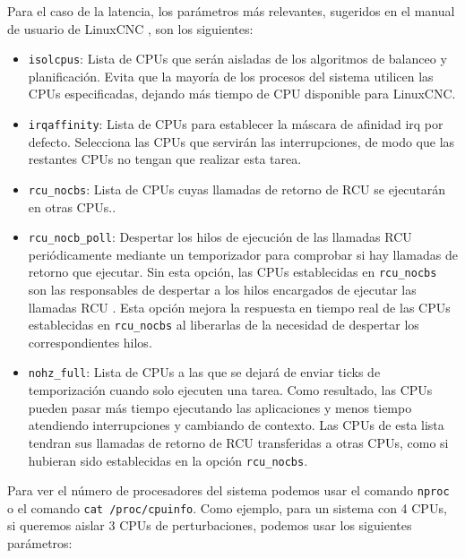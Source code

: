 \documentclass[english,spanish,a4paper,11pt]{article}
\begin{document}
Para el caso de la latencia, los parámetros más relevantes, sugeridos en el manual de usuario de LinuxCNC \cite{linuxcncdoc}, son los siguientes:
%
\begin{itemize}
    \item \texttt{isolcpus}: Lista de \acp{CPU} que serán aisladas de los algoritmos de balanceo y planificación. Evita que la mayoría de los procesos del sistema utilicen las \acp{CPU} especificadas, dejando más tiempo de \ac{CPU} disponible para LinuxCNC.

    \item \texttt{irqaffinity}: Lista de \acp{CPU} para establecer la máscara de afinidad irq por defecto. Selecciona las \acp{CPU} que servirán las interrupciones, de modo que las restantes \acp{CPU} no tengan que realizar esta tarea.

    \item \texttt{rcu\_nocbs}: Lista de \acp{CPU} cuyas llamadas de retorno de \ac{RCU} se ejecutarán en otras \acp{CPU}.\cite{enwiki:1169786538,redhat_rt_rcu}. 

    \item \texttt{rcu\_nocb\_poll}: Despertar los hilos de ejecución de las llamadas \ac{RCU} periódicamente mediante un temporizador para comprobar si hay llamadas de retorno que ejecutar. Sin esta opción, las \acp{CPU} establecidas en \texttt{rcu\_nocbs} son las responsables de despertar a los hilos encargados de ejecutar las llamadas \ac{RCU} \cite{redhat_rt_rcu}. Esta opción mejora la respuesta en tiempo real de las \acp{CPU} establecidas en \texttt{rcu\_nocbs} al liberarlas de la necesidad de despertar los correspondientes hilos.
    
    \item \texttt{nohz\_full}: Lista de \acp{CPU} a las que se dejará de enviar ticks de temporización cuando solo ejecuten una tarea. Como resultado, las \acp{CPU} pueden pasar más tiempo ejecutando las aplicaciones y menos tiempo atendiendo interrupciones y cambiando de contexto. Las \acp{CPU} de esta lista tendran sus llamadas de retorno de \ac{RCU} transferidas a otras \acp{CPU}, como si hubieran sido establecidas en la opción \texttt{rcu\_nocbs}.
\end{itemize}

Para ver el número de procesadores del sistema podemos usar el comando \texttt{nproc} o el comando \texttt{cat /proc/cpuinfo}. Como ejemplo, para un sistema con 4 \acp{CPU}, si queremos aislar 3 \acp{CPU} de perturbaciones, podemos usar los siguientes parámetros:
\end{document}
